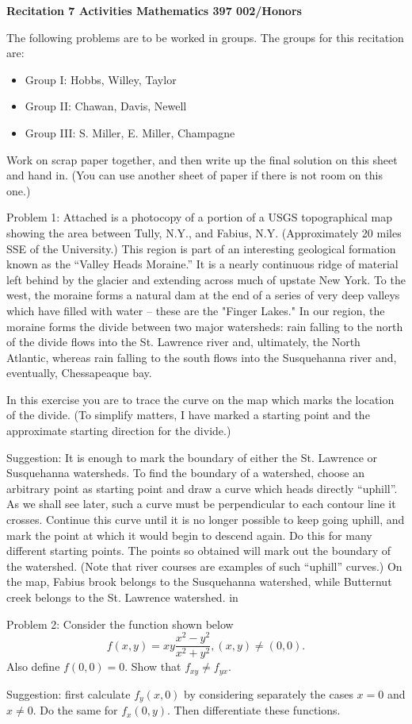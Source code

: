 
\sf
\begin{center}
{\bf Recitation 7 Activities  Mathematics 397 002/Honors }
\end{center}
\bigskip
The following  problems are to be worked in groups. The groups for
this recitation are: 
\begin{itemize}
\item Group I: Hobbs, Willey, Taylor
\item Group II: Chawan, Davis, Newell
\item Group III: S. Miller, E. Miller, Champagne
\end{itemize}

Work on scrap paper together, and then write up the final solution on this
sheet and hand in. (You can use another sheet of paper if there is not
room on this one.)
\par
\bigskip

Problem 1: Attached is a photocopy of a portion of a USGS topographical map
showing the area between Tully, N.Y., and Fabius, N.Y. (Approximately 20 miles
SSE of the University.) This region is part of an interesting geological
formation known as the ``Valley Heads Moraine.'' It is a nearly continuous
ridge of material left behind by the glacier and extending across much of
upstate New York. To the west, the moraine forms a natural dam at
the end of a series of very deep valleys which have filled with water -- these 
are the "Finger Lakes." In our region, the moraine forms the divide
between two major watersheds: rain falling to the north of the divide flows
into the St. Lawrence river and, ultimately, the North Atlantic, whereas rain
falling to the south  flows into the Susquehanna river and,
eventually, Chessapeaque bay.
	
In this exercise you are to trace the curve on the map which marks the location
of the divide. (To simplify matters, I have marked a starting point and
the approximate starting direction for the divide.)

Suggestion: It is enough to mark the boundary of either the St. Lawrence or
Susquehanna watersheds. To find the boundary of a watershed, choose an arbitrary
point 
as starting point
and draw a curve which heads directly ``uphill''. As we shall see
later, such a curve must be perpendicular to each contour line it crosses.
Continue this curve until it is no longer possible to keep going uphill, and
mark the point at which it would begin to descend again. Do this for many
different starting points. The points so obtained will mark out the boundary
of the watershed. (Note that river courses are examples of such ``uphill''
curves.) On the map, Fabius brook belongs to the Susquehanna watershed, while
Butternut creek belongs to the St. Lawrence watershed.
 in
\par
Problem 2: Consider the function shown below
$$
f(x,y) = xy\frac{x^2-y^2}{x^2 + y^2}, (x,y) \ne (0,0).
$$
Also define $f(0,0) = 0.$ Show that $f_{xy} \ne f_{yx}.$ 

Suggestion: first calculate $f_y(x,0) $ by considering separately the cases
$x = 0 $ and $ x\ne 0.$ Do the same for $f_x(0,y).$ Then differentiate these
functions.

